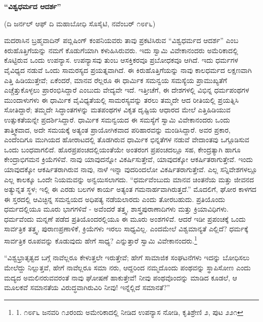 \begin{center}
\textbf{“ವಿಶ್ವಧರ್ಮದ ಆದರ್ಶ”}
\end{center}

\begin{center}
(ದಿ ಜರ್ನಲ್ ಆಫ್ ದಿ ಮಹಾಬೋಧಿ ಸೊಸೈಟಿ, ನವೆಂಬರ್ ೧೮೯೬)
\end{center}

ಮದರಾಸಿನ ಬ್ರಹ್ಮವಾದಿನ್ ಪಬ್ಲಿಷಿಂಗ್ ಕಂಪನಿಯವರು ತಾವು ಪ್ರಕಟಿಸಿರುವ “ವಿಶ್ವಧರ್ಮದ ಆದರ್ಶ” ಎಂಬ ಕಿರುಹೊತ್ತಿಗೆಯನ್ನು ನಮಗೆ ಕೊಡುಗೆಯಾಗಿ ಕಳುಹಿಸಿರುವರು. ಇದು ಸ್ವಾಮಿ ವಿವೇಕಾನಂದರು ಅಮೆರಿಕಾದಲ್ಲಿ ಕೊಟ್ಟಿರುವ ಒಂದು ಉಪನ್ಯಾಸ. ಉಪನ್ಯಾಸವು ತುಂಬ ಆಸಕ್ತಿಕರವೂ ಪ್ರಬೋಧಕವೂ ಆಗಿದೆ. ಇದು ಧರ್ಮಗಳ ವೈವಿಧ್ಯದ ನಡುವೆ ಒಂದು ಸಾಮರಸ್ಯದ ಪ್ರಯತ್ನವಾಗಿದೆ. ಈ ಕಿರುಹೊತ್ತಿಗೆಯನ್ನು ನಾವು ಕಾಲಧರ್ಮದ ಲಕ್ಷಣವಾಗಿ ಎತ್ತಿ ಹಿಡಿಯುತ್ತೇವೆ; ಏಕೆಂದರೆ, ಮಾನವ ರೆಲ್ಲರೂ ಈ ಧಾರ್ಮಿಕ ಸಮನ್ವಯ ಸಮಸ್ಯೆಯ ಪ್ರಾಮುಖ್ಯತೆಗೆ ಎಚ್ಚೆತ್ತುಕೊಳ್ಳಲು ಪ್ರಾರಂಭಿಸಿದ್ದಾರೆ ಎಂಬುದು ವೇದ್ಯವೇ ಇದೆ. ಇತ್ತೀಚೆಗೆ, ಈ ದೇಶಗಳಲ್ಲಿ ವಿಭಿನ್ನ ಧರ್ಮಪಂಥಗಳ ಮುಂದಾಳುಗಳು ಈ ಧಾರ್ಮಿಕ ವೈವಿಧ್ಯತೆಯಲ್ಲಿ ಸಾಮರಸ್ಯವನ್ನು ತರಲು ತಮ್ಮದೇ ಆದ ರೀತಿಯಲ್ಲಿ ಪ್ರಯತ್ನಿಸಿ ಸೋತಿದ್ದಾರೆ; ತಮ್ಮದೇ ಸಿದ್ಧಾಂತಗಳನ್ನು ಮತಪಂಥಗಳ ವಿಕೃತ ದೃಷ್ಟಿಯ ಆಧಾರದ ಮೇಲೆ ಎತ್ತಿಹಿಡಿಯುವ ಉತ್ಸುಕತೆಯನ್ನೇ ಪ್ರದರ್ಶಿಸಿದ್ದಾರೆ. ಧಾರ್ಮಿಕ ಸಮನ್ವಯದ ಈ ಸಮಸ್ಯೆಗೆ ಸ್ವಾಮಿ ವಿವೇಕಾನಂದರು ಒಂದು ತಾತ್ತ್ವಿಕವಾದ, ಅದೇ ಸಮಯಕ್ಕೆ ಅತ್ಯಂತ ಪ್ರಾಯೋಗಿಕವಾದ ಪರಿಹಾರವನ್ನು ಮಂಡಿಸಿದ್ದಾರೆ. ಅವರ ಪ್ರಕಾರ, ಎಂದೆಂದಿಗೂ ಮುಗಿಯದ ಹೋರಾಟದಲ್ಲಿ ತೊಡಗಿರುವ ಧಾರ್ಮಿಕ ಭಿನ್ನತೆಗಳ ನಡುವೆ ವೇದಾಂತವು ಒಗ್ಗೂಡಿಸುವ ಒಂದು ಬಂಧವಾಗಲಿದೆ. ಹೊರಪ್ರಪಂಚದಲ್ಲಿಯಂತೆಯೇ ಅಂತರಂಗ ಪ್ರಪಂಚದಲ್ಲೂ ಸಹ, ಕೇಂದ್ರತ್ಯಾಗಿ ಹಾಗೂ ಕೇಂದ್ರಾಭಿಗಮನ ಕ್ರಿಯೆಗಳಿವೆ. ನಾವು ಯಾವುದನ್ನೋ ವಿಕರ್ಷಿಸುತ್ತೇವೆ, ಯಾವುದಕ್ಕೋ ಆಕರ್ಷಿತರಾಗುತ್ತೇವೆ. ಇಂದು ಯಾವುದಕ್ಕೋ ಆಕರ್ಷಿತರಾಗಿರುವ ನಾವು, ನಾಳೆ ಇನ್ನಾ ವುದರಿಂದಲೋ ವಿಕರ್ಷಿತರಾಗುತ್ತೇವೆ. ಎಲ್ಲ ಸನ್ನಿವೇಶಗಳಲ್ಲೂ ಎಲ್ಲ ಕಾಲಕ್ಕೂ ಒಂದೇ ನಿಯಮವನ್ನು ಅನ್ವಯಿಸಲಾಗದು. “ಧರ್ಮವೆಂಬುದು ಮಾನವ ಚಿಂತನೆಯ ಮತ್ತು ಜೀವನದ ಅತ್ಯುನ್ನತ ಸ್ಥಳ; ಇಲ್ಲಿ ಈ ಎರಡು ಬಲಗಳ ಕಾರ್ಯ ಅತ್ಯಂತ ಗಮನಾರ್ಹವಾಗಿರುತ್ತದೆ.” ಮೊದಲಿಗೆ, ಘೋರ ಕಾಳಗದ ಈ ಸ್ತರದಲ್ಲಿ ಆವಿಚ್ಛಿನ್ನ ಸಮನ್ವಯದ ಅಧಿಪತ್ಯ ನಡೆಯಲಾರದು ಎಂದು ತೋರಬಹುದು. ಪ್ರತಿಯೊಂದು ಧರ್ಮದಲ್ಲಿಯೂ ಮೂರು ಭಾಗಗಳಿವೆ - ಅವೆಂದರೆ ತತ್ತ್ವ, ಶಾಸ್ತ್ರಪುರಾಣಾದಿಗಳು ಮತ್ತು ಕ್ರಿಯಾವಿಧಿಗಳು. ಧರ್ಮವೆಂದು ಮನ್ನಣೆ ಪಡೆದ ಪ್ರತಿಯೊಂದರಲ್ಲಿಯೂ ಈ ಮೂರು ಅಂಶಗಳಿವೆ. ಆದರೆ ಇಡೀ ಪ್ರಪಂಚಕ್ಕೆ ಒಂದು ಸಾರ್ವತ್ರಿಕ ತತ್ತ್ವ, ಪುರಾಣಪ್ರಣಾಳಿಕೆ, ಕ್ರಿಯೆಗಳು ಇರಲು ಸಾಧ್ಯವಿಲ್ಲ. ಎಂದಮೇಲೆ ವಿಶ್ವಮಾನ್ಯತೆ ಎಲ್ಲಿದೆ? ಧರ್ಮಕ್ಕೆ ಸಾರ್ವತ್ರಿಕ ರೂಪವನ್ನು ಕೊಡುವುದು ಹೇಗೆ ಸಾಧ್ಯ? ಎನ್ನುತ್ತಾರೆ ಸ್ವಾಮಿ ವಿವೇಕಾನಂದರು.\footnote{1. ೧೮೯೬ ಜನವರಿ ೧೨ರಂದು ಅಮೇರಿಕಾದಲ್ಲಿ ನೀಡಿದ ಉಪನ್ಯಾಸ ನೋಡಿ, ಕೃತಿಶ್ರೇಣಿ ೨, ಪುಟ ೨೨೧}

“ವಿಶ್ವಭ್ರಾತೃತ್ವದ ಬಗ್ಗೆ ನಾವೆಲ್ಲರೂ ಕೇಳುತ್ತಲೇ ಇರುತ್ತೇವೆ; ಹೇಗೆ ಸಾಮಾಜಿಕ ಸಂಘಟನೆಗಳು ಇದನ್ನು ಬೋಧಿಸಲು ಮೇಲೆದ್ದು ನಿಲ್ಲುತ್ತವೆ, ಹೇಗೆ ನಾವೆಲ್ಲರೂ ಸಮಾ ನರು, ಆದ್ದರಿಂದ ನಮ್ಮದೊಂದು ಪಂಥವನ್ನು ಸ್ಥಾಪಿಸೋಣ ಎಂದು ಮದ್ಯದ ಅಮಲಿನರುವವರಂತೆ ನಾವು ಘೋಷಣೆ ಹಾಕುತ್ತೇವೆ! ನೀವು ಪಂಥವೊಂದನ್ನು ಮಾಡಿದ ಕೂಡಲೆ, ಆ ಮೂಲಕವೆ ಸಮಾನತೆಯ ವಿರುದ್ಧವಾಗಿರುವಿರಿ ನೀವು! ಇನ್ನೆಲ್ಲಿದೆ ಸಮಾನತೆ?”

